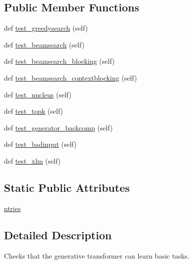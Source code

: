 \subsection*{Public Member Functions}
\begin{DoxyCompactItemize}
\item 
def \hyperlink{classtests_1_1test__transformers_1_1TestTransformerGenerator_a46ea25442100b52add258989e9aa9860}{test\+\_\+greedysearch} (self)
\item 
def \hyperlink{classtests_1_1test__transformers_1_1TestTransformerGenerator_af16ba00a7a4c07df6bed84c8aad2635c}{test\+\_\+beamsearch} (self)
\item 
def \hyperlink{classtests_1_1test__transformers_1_1TestTransformerGenerator_a8f0e08e6e487c697c1e0839dc111a3a5}{test\+\_\+beamsearch\+\_\+blocking} (self)
\item 
def \hyperlink{classtests_1_1test__transformers_1_1TestTransformerGenerator_a582830b5de9edfa1b6077988067f9143}{test\+\_\+beamsearch\+\_\+contextblocking} (self)
\item 
def \hyperlink{classtests_1_1test__transformers_1_1TestTransformerGenerator_ab1e05d5384de2fcd880f515108de9b4a}{test\+\_\+nucleus} (self)
\item 
def \hyperlink{classtests_1_1test__transformers_1_1TestTransformerGenerator_a571dff6d213773d3590419d84f0b088f}{test\+\_\+topk} (self)
\item 
def \hyperlink{classtests_1_1test__transformers_1_1TestTransformerGenerator_a5eb4d78c39c3b525e3254789c2101072}{test\+\_\+generator\+\_\+backcomp} (self)
\item 
def \hyperlink{classtests_1_1test__transformers_1_1TestTransformerGenerator_a6a21a74b697b8918bc38625e443e24d1}{test\+\_\+badinput} (self)
\item 
def \hyperlink{classtests_1_1test__transformers_1_1TestTransformerGenerator_a42e386425e0e497ccb97a73409192990}{test\+\_\+xlm} (self)
\end{DoxyCompactItemize}
\subsection*{Static Public Attributes}
\begin{DoxyCompactItemize}
\item 
\hyperlink{classtests_1_1test__transformers_1_1TestTransformerGenerator_a1555f81fb11a5497f644e99607c3d17d}{ntries}
\end{DoxyCompactItemize}


\subsection{Detailed Description}
\begin{DoxyVerb}Checks that the generative transformer can learn basic tasks.
\end{DoxyVerb}
 

